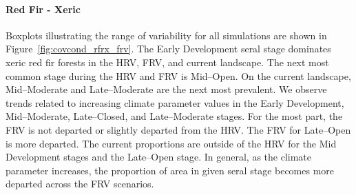 \paragraph*{Red Fir - Xeric} 
Boxplots illustrating the range of variability for all simulations are shown in Figure~\ref{fig:covcond_rfrx_frv}. The Early Development seral stage dominates xeric red fir forests in the HRV, FRV, and current landscape. The next most common stage during the HRV and FRV is Mid--Open. On the current landscape, Mid--Moderate and Late--Moderate are the next most prevalent. We observe trends related to increasing climate parameter values in the Early Development, Mid--Moderate, Late--Closed, and Late--Moderate stages. For the most part, the FRV is not departed or slightly departed from the HRV. The FRV for Late--Open is more departed. The current proportions are outside of the HRV for the Mid Development stages and the Late--Open stage. In general, as the climate parameter increases, the proportion of area in given seral stage becomes more departed across the FRV scenarios.



